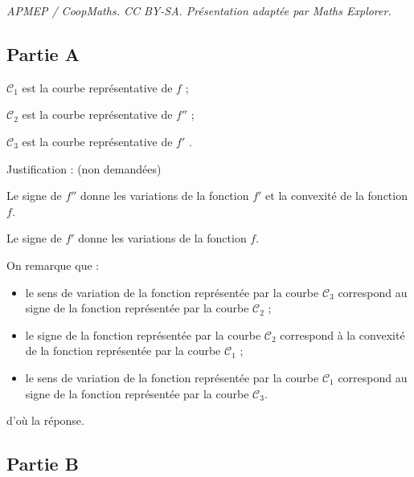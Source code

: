 \documentclass[10pt]{article}
\begin{document}
\noindent\textit{APMEP / CoopMaths. CC BY-SA. Présentation adaptée par Maths Explorer.}\par\medskip
\subsection*{Partie A}


	$\mathcal{C}_{1}$ est la courbe représentative de $f$ ;

	$\mathcal{C}_{2}$ est la courbe représentative de $f''$ ;

	$\mathcal{C}_{3}$ est la courbe représentative de  $f'$ .

	Justification :  (non demandées)

	Le signe de $f''$ donne les variations de la fonction $f'$ et la convexité de la fonction $f$.

	Le signe de $f'$ donne les variations de la fonction $f$.

	On remarque que  :
	\begin{itemize}
		\item le sens de variation de la fonction représentée par la courbe $\mathcal{C}_{3}$ correspond  au signe de la fonction représentée par  la courbe $\mathcal{C}_{2}$ ;

		\item le signe de la fonction représentée par la courbe $\mathcal{C}_{2}$ correspond à la convexité de la fonction représentée par la courbe $\mathcal{C}_{1}$ ;

		\item  le sens de variation de la fonction représentée par la courbe $\mathcal{C}_{1}$ correspond  au signe de la fonction représentée par  la courbe $\mathcal{C}_{3}$.
	\end{itemize}
	d'où la réponse.



	\subsection*{Partie B}
\end{document}
